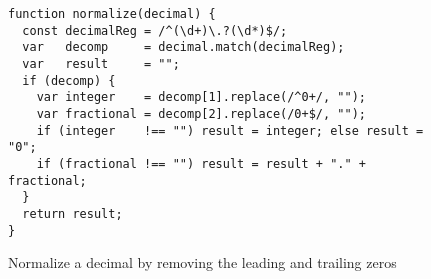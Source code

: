 \begin{figure}[tb]
\begin{center}
\begin{verbatim}
function normalize(decimal) {
  const decimalReg = /^(\d+)\.?(\d*)$/;
  var   decomp     = decimal.match(decimalReg);
  var   result     = "";
  if (decomp) {
    var integer    = decomp[1].replace(/^0+/, "");
    var fractional = decomp[2].replace(/0+$/, "");
    if (integer    !== "") result = integer; else result = "0"; 
    if (fractional !== "") result = result + "." + fractional;
  }
  return result;
}
\end{verbatim}
\end{center}
\caption{Normalize a decimal by removing the leading and trailing zeros
    \label{fig-run-exmp}}
\end{figure}

